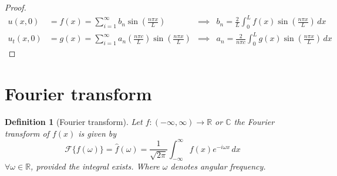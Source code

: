 \documentclass[oneside,11pt,pdftex,final]{book}%
\numberwithin{equation}{section}
\newtheorem{example}[theorem]{Example}
\newtheorem{definition}[theorem]{Definition}
\numberwithin{section}{chapter}
\numberwithin{equation}{chapter}
\newcommand{\R}{\mathbb{R}}
\newcommand{\C}{\mathbb{C}}
\begin{document}
\begin{proof}
\begin{align*}
	u(x,0)&=f(x)=\sum_{i=1}^\infty b_n \sin \left(\frac{n\pi x}{L}\right) &\implies& b_n=\frac{2}{L}\int_0^L f(x) \sin \left(\frac{n \pi x}{L}\right)\, dx\\
	u_t(x,0)&=g(x)=\sum_{i=1}^\infty a_n \left(\frac{n \pi c}{L}\right)\sin \left(\frac{n \pi x}{L}\right)&\implies& a_n=\frac{2}{n \pi c} \int_0^L g(x) \sin \left(\frac{n \pi x}{L}\right)\, dx
\end{align*}


\end{proof}

%	
%




\section{Fourier transform}
\begin{definition}[Fourier transform]
	Let $ f:(-\infty, \infty)\to \R  $ or $ \C $ the Fourier transform of $ f(x) $ is given by\[ \mathcal{F}\{f(\omega)\}=\hat{f}(\omega)=\frac{1}{\sqrt{2\pi}}\int_{-\infty}^\infty f(x)e^{-i \omega x}\, dx \]
	$ \forall \omega \in \R $, provided the integral exists. Where $ \omega  $ denotes angular frequency.
\end{definition}
\end{document}
